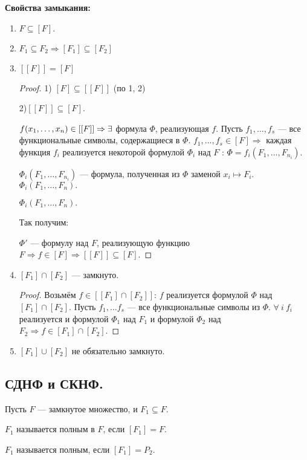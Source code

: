 \textbf{Свойства замыкания:}
\begin{enumerate}
	\item $F \subseteq [F].$
	\item $F_1 \subseteq F_2 \Longrightarrow [F_1] \subseteq [F_2]$
	\item $[[F]] = [F]$
	\begin{proof}
		1) $[F] \subseteq [[F]]$ (по 1, 2)

		2)$[[F]] \subseteq [F]$.

		$f(x_1, \ldots, x_n) \in [[F]] \Rightarrow \exists$ формула $\Phi$, реализующая $f$. Пусть $f_1, \ldots, f_s$ --- все функциональные символы, содержащиеся в $\Phi$. $f_1, \ldots, f_s \in [F] \Rightarrow $ каждая функция $f_i$ реализуется некоторой формулой $\Phi_i$ над $F$ : $\Phi = f_i(F_1, \ldots, F_{n_i})$.

		$\Phi_i(F_1, \ldots, F_{n_i})$ --- формула, полученная из $\Phi$ заменой $x_i \longmapsto F_i$. $\Phi_i(F_1, \ldots, F_n).$

		$\Phi_i(F_1, \ldots, F_n).$

		Так получим: 

		$\Phi'$ --- формулу над $F$, реализующую функцию $F \Rightarrow f \in [F] \Rightarrow [[F]] \subseteq [F]$.
	\end{proof}
	\item  $[F_1] \cap [F_2]$ --- замкнуто.
	\begin{proof}
		Возьмём $f \in [[F_1] \cap [F_2]]$: $f$ реализуется формулой $\Phi$ над $[F_1] \cap [F_2]$. Пусть $f_1, \ldots f_s$ --- все функциональные символы из $\Phi$. $\forall \: i \: f_i$ реализуется и формулой $\Phi_1$ над $F_1$ и формулой $\Phi_2$ над $F_2 \Rightarrow f \in  [F_1] \cap [F_2]$.
	\end{proof}
	\item  $[F_1] \cup [F_2]$ не обязательно замкнуто.
\end{enumerate}

\subsection{СДНФ и СКНФ.}
Пусть $F$ --- замкнутое множество, и $F_1 \subseteq F$.

\begin{df}
	$F_1$ называется полным в $F$, если $[F_1] = F$.
\end{df}

\begin{df}
	$F_1$ называется полным, если $[F_1] = P_2$.
\end{df}

